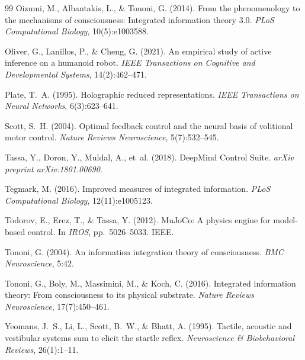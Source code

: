 \documentclass[11pt,a4paper]{article}
\begin{document}
\begin{thebibliography}{99}
Oizumi, M., Albantakis, L., \& Tononi, G. (2014).
\newblock From the phenomenology to the mechanisms of consciousness: Integrated information theory 3.0.
\newblock \emph{PLoS Computational Biology}, 10(5):e1003588.

Oliver, G., Lanillos, P., \& Cheng, G. (2021).
\newblock An empirical study of active inference on a humanoid robot.
\newblock \emph{IEEE Transactions on Cognitive and Developmental Systems}, 14(2):462--471.

Plate, T.~A. (1995).
\newblock Holographic reduced representations.
\newblock \emph{IEEE Transactions on Neural Networks}, 6(3):623--641.

Scott, S.~H. (2004).
\newblock Optimal feedback control and the neural basis of volitional motor control.
\newblock \emph{Nature Reviews Neuroscience}, 5(7):532--545.

Tassa, Y., Doron, Y., Muldal, A., et~al. (2018).
\newblock DeepMind Control Suite.
\newblock \emph{arXiv preprint arXiv:1801.00690}.

Tegmark, M. (2016).
\newblock Improved measures of integrated information.
\newblock \emph{PLoS Computational Biology}, 12(11):e1005123.

Todorov, E., Erez, T., \& Tassa, Y. (2012).
\newblock MuJoCo: A physics engine for model-based control.
\newblock In \emph{IROS}, pp.\ 5026--5033. IEEE.

Tononi, G. (2004).
\newblock An information integration theory of consciousness.
\newblock \emph{BMC Neuroscience}, 5:42.

Tononi, G., Boly, M., Massimini, M., \& Koch, C. (2016).
\newblock Integrated information theory: From consciousness to its physical substrate.
\newblock \emph{Nature Reviews Neuroscience}, 17(7):450--461.

Yeomans, J.~S., Li, L., Scott, B.~W., \& Bhatt, A. (1995).
\newblock Tactile, acoustic and vestibular systems sum to elicit the startle reflex.
\newblock \emph{Neuroscience \& Biobehavioral Reviews}, 26(1):1--11.

\end{thebibliography}
\end{document}
